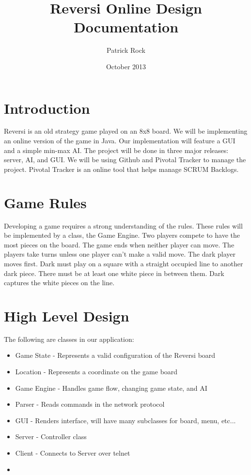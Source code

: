 \documentclass{article}
\title{Reversi Online Design Documentation}
\author{Patrick Rock}
\date{October 2013}
\begin{document}
\maketitle

\section{Introduction}
Reversi is an old strategy game played on an 8x8 board. We will be implementing
an online version of the game in Java. Our implementation will feature a GUI and a simple
min-max AI. The project will be done in three major releases: server, AI, and GUI.
We will be using Github and Pivotal Tracker to manage the project. Pivotal Tracker
is an online tool that helps manage SCRUM Backlogs.

\section{Game Rules}
Developing a game requires a strong understanding of the rules. These rules will
be implemented by a class, the Game Engine.
Two players compete to have the most pieces on the board. 
The game ends when neither player can move.
The players take turns unless one player can't make a valid move. 
The dark player moves first.
Dark must play on a square with a straight occupied line to another dark piece. There 
must be at least one white piece in between them. Dark captures the white pieces
on the line.

\section{High Level Design}
The following are classes in our application:
\begin{itemize}
\item Game State   - Represents a valid configuration of the Reversi board
\item Location     - Represents a coordinate on the game board
\item Game Engine  - Handles game flow, changing game state, and AI
\item Parser       - Reads commands in the network protocol 
\item GUI          - Renders interface, will have many subclasses for board, menu, etc...
\item Server       - Controller class
\item Client       - Connects to Server over telnet
\item 
\end{itemize}
\end{document}
